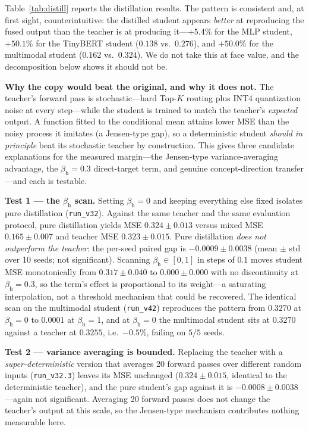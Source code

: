 \documentclass[10pt]{article}
\theoremstyle{definition}
\theoremstyle{plain}
\theoremstyle{remark}
\begin{document}
Table~\ref{tab:distill} reports the distillation results. The pattern is consistent and, at first sight, counterintuitive: the distilled student appears \emph{better} at reproducing the fused output than the teacher is at producing it---$+5.4\%$ for the MLP student, $+50.1\%$ for the TinyBERT student ($0.138$ vs.\ $0.276$), and $+50.0\%$ for the multimodal student ($0.162$ vs.\ $0.324$). We do not take this at face value, and the decomposition below shows it should not be.

\textbf{Why the copy would beat the original, and why it does not.} The teacher's forward pass is stochastic---hard Top-$K$ routing plus INT4 quantization noise at every step---while the student is trained to match the teacher's \emph{expected} output. A function fitted to the conditional mean attains lower MSE than the noisy process it imitates (a Jensen-type gap), so a deterministic student \emph{should in principle} beat its stochastic teacher by construction. This gives three candidate explanations for the measured margin---the Jensen-type variance-averaging advantage, the $\beta_{\text{h}}=0.3$ direct-target term, and genuine concept-direction transfer---and each is testable.

\textbf{Test 1 --- the $\beta_{\text{h}}$ scan.} Setting $\beta_{\text{h}}=0$ and keeping everything else fixed isolates pure distillation (\texttt{run\_v32}). Against the same teacher and the same evaluation protocol, pure distillation yields MSE $0.324 \pm 0.013$ versus mixed MSE $0.165 \pm 0.007$ and teacher MSE $0.323 \pm 0.015$. Pure distillation \emph{does not outperform the teacher}: the per-seed paired gap is $-0.0009 \pm 0.0038$ (mean $\pm$ std over 10 seeds; not significant). Scanning $\beta_{\text{h}} \in [0,1]$ in steps of $0.1$ moves student MSE monotonically from $0.317 \pm 0.040$ to $0.000 \pm 0.000$ with no discontinuity at $\beta_{\text{h}}=0.3$, so the term's effect is proportional to its weight---a saturating interpolation, not a threshold mechanism that could be recovered. The identical scan on the multimodal student (\texttt{run\_v42}) reproduces the pattern from $0.3270$ at $\beta_{\text{h}}{=}0$ to $0.0001$ at $\beta_{\text{h}}{=}1$, and at $\beta_{\text{h}}{=}0$ the multimodal student sits at $0.3270$ against a teacher at $0.3255$, i.e.\ $-0.5\%$, failing on $5/5$ seeds.

\textbf{Test 2 --- variance averaging is bounded.} Replacing the teacher with a \emph{super-deterministic} version that averages 20 forward passes over different random inputs (\texttt{run\_v32.3}) leaves its MSE unchanged ($0.324 \pm 0.015$, identical to the deterministic teacher), and the pure student's gap against it is $-0.0008 \pm 0.0038$---again not significant. Averaging 20 forward passes does not change the teacher's output at this scale, so the Jensen-type mechanism contributes nothing measurable here.
\end{document}
